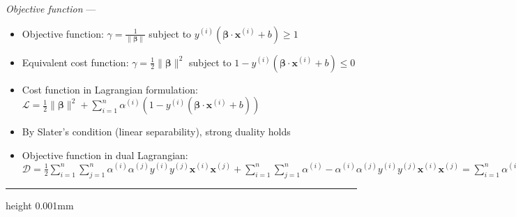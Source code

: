 \emph{Objective function} --- 
\begin{itemize}
    \item Objective function: $\gamma = \frac{1}{\| \boldsymbol{\beta} \|} $ subject to $y^{(i)} (\boldsymbol{\beta} \cdot \boldsymbol{x}^{(i)} + b) \geq 1$
    \item Equivalent cost function: $\gamma = \frac{1}{2} \| \boldsymbol{\beta} \|^2 $ subject to $1 - y^{(i)} (\boldsymbol{\beta} \cdot \boldsymbol{x}^{(i)} + b) \leq 0$
    \item Cost function in Lagrangian formulation: $\mathcal{L} = \frac{1}{2} \| \boldsymbol{\beta} \|^2 + \sum_{i=1}^n \alpha^{(i)} (1 - y^{(i)} (\boldsymbol{\beta} \cdot \boldsymbol{x}^{(i)} + b))$
    \item By Slater's condition (linear separability), strong duality holds
    \item Objective function in dual Lagrangian: $\mathcal{D} = \frac{1}{2}  \sum_{i=1}^n  \sum_{j=1}^n \alpha^{(i)}\alpha^{(j)} y^{(i)}y^{(j)} \boldsymbol{x}^{(i)}\boldsymbol{x}^{(j)} + \sum_{i=1}^n  \sum_{j=1}^n \alpha^{(i)} - \alpha^{(i)}\alpha^{(j)} y^{(i)}y^{(j)} \boldsymbol{x}^{(i)}\boldsymbol{x}^{(j)} = \sum_{i=1}^n \alpha^{(i)} - \frac{1}{2}  \sum_{i=1}^n  \sum_{j=1}^n \alpha^{(i)}\alpha^{(j)} y^{(i)}y^{(j)} \boldsymbol{x}^{(i)}\boldsymbol{x}^{(j)}$
\end{itemize}

{\color{lightgray}\hrule height 0.001mm}

